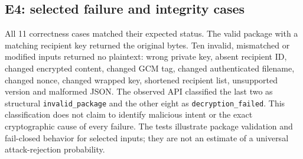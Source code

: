 \subsection{E4: selected failure and integrity cases}
All 11 correctness cases matched their expected status. The valid package with a matching recipient key returned the original bytes. Ten invalid, mismatched or modified inputs returned no plaintext: wrong private key, absent recipient ID, changed encrypted content, changed GCM tag, changed authenticated filename, changed nonce, changed wrapped key, shortened recipient list, unsupported version and malformed JSON. The observed API classified the last two as structural \texttt{invalid\_package} and the other eight as \texttt{decryption\_failed}. This classification does not claim to identify malicious intent or the exact cryptographic cause of every failure. The tests illustrate package validation and fail-closed behavior for selected inputs; they are not an estimate of a universal attack-rejection probability.
